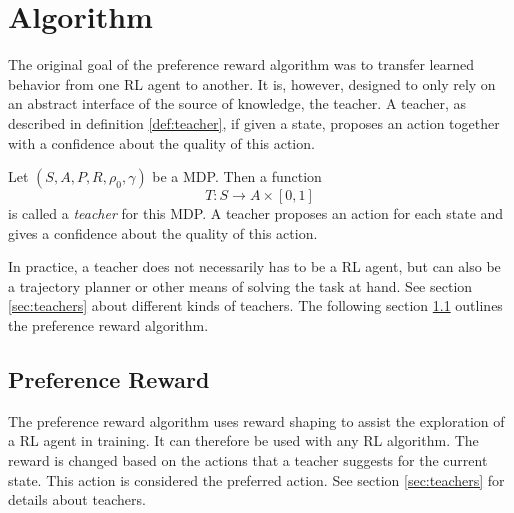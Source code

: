 \chapter{Algorithm}
\label{ch:algorithm}

The original goal of the preference reward algorithm was to transfer learned behavior from one RL agent to another. It is, however, designed to only rely on an abstract interface of the source of knowledge, the teacher. A teacher, as described in definition \ref{def:teacher}, if given a state, proposes an action together with a confidence about the quality of this action.
\begin{definition}
    \label{def:teacher}
     Let $(S, A, P, R, \rho_0, \gamma)$ be a MDP. Then a function $$T: S \rightarrow A\times[0,1]$$ is called a \emph{teacher} for this MDP. A teacher proposes an action for each state and gives a confidence about the quality of this action.
\end{definition}
In practice, a teacher does not necessarily has to be a RL agent, but can also be a trajectory planner or other means of solving the task at hand. See section \ref{sec:teachers} about different kinds of teachers. The following section \ref{sec:preference-reward} outlines the preference reward algorithm.

\section{Preference Reward}
\label{sec:preference-reward}

The preference reward algorithm uses reward shaping to assist the exploration of a RL agent in training. It can therefore be used with any RL algorithm. The reward is changed based on the actions that a teacher suggests for the current state. This action is considered the preferred action. See section \ref{sec:teachers} for details about teachers.

